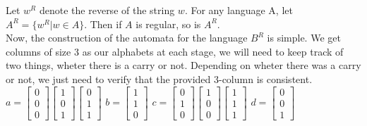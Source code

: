 \documentclass{article}
\begin{document}
{{{Let $w^R$ denote the reverse of the string $w$. For any language A, let $A^R = \{w^R | w\in A\}$.
Then if $A$ is regular, so is $A^R$.
\\
Now, the construction of the automata for the language $B^R$ is simple. We get columns of size 3
as our alphabets at each stage, we will need to keep track of two things, wheter there is a carry or not. Depending on wheter there
was a carry or not, we just need to verify that the provided 3-column is consistent. \\
$a = 
\begin{bmatrix}
    0 \\
    0 \\
    0  
\end{bmatrix}
\begin{bmatrix}
    1 \\
    0 \\
    1  
\end{bmatrix}
\begin{bmatrix}
    0 \\
    1 \\
    1  
\end{bmatrix}
$
$b = 
\begin{bmatrix}
    1 \\
    1 \\
    0  
\end{bmatrix}
$
$c = 
\begin{bmatrix}
    0 \\
    1 \\
    0  
\end{bmatrix}
\begin{bmatrix}
    1 \\
    0 \\
    0  
\end{bmatrix}
\begin{bmatrix}
    1 \\
    1 \\
    1  
\end{bmatrix}
$
$d = 
\begin{bmatrix}
    0 \\
    0 \\
    1  
\end{bmatrix}
$
\begin{center}
\end{center}}}}
\end{document}
